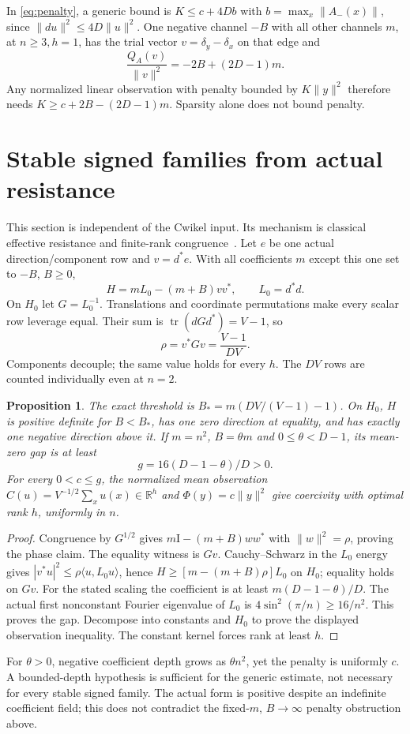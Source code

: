 \documentclass[11pt,a4paper]{article}
\newtheorem{proposition}[theorem]{Proposition}
\newcommand{\R}{\mathbb R}
\newcommand{\tr}{\operatorname{tr}}
\newcommand{\id}{\mathrm I}
\begin{document}
In \eqref{eq:penalty}, a generic bound is $K\leq c+4Db$ with
$b=\max_x\|A_-(x)\|$, since $\|du\|^2\leq4D\|u\|^2$.
One negative channel $-B$ with all other channels $m$, at $n\geq3,h=1$,
has the trial vector $v=\delta_y-\delta_x$ on that edge and
\[
 \frac{Q_A(v)}{\|v\|^2}=-2B+(2D-1)m.
\]
Any normalized linear observation with penalty bounded by $K\|y\|^2$
therefore needs $K\geq c+2B-(2D-1)m$. Sparsity alone does not bound penalty.

\section{Stable signed families from actual resistance}
This section is independent of the Cwikel input. Its mechanism is classical
effective resistance and finite-rank congruence~\cite{Zelazo,Spielman}.
Let $e$ be one actual direction/component row and $v=d^*e$. With all
coefficients $m$ except this one set to $-B$, $B\geq0$,
\[
 H=mL_0-(m+B)vv^*,\qquad L_0=d^*d.
\]
On $H_0$ let $G=L_0^{-1}$. Translations and coordinate permutations make
every scalar row leverage equal. Their sum is
$\tr(dGd^*)=V-1$, so
\begin{equation}\label{eq:rho}
 \rho=v^*Gv=\frac{V-1}{DV}.
\end{equation}
Components decouple; the same value holds for every $h$. The $DV$ rows
are counted individually even at $n=2$.

\begin{proposition}\label{prop:phase}
The exact threshold is $B_*=m(DV/(V-1)-1)$. On $H_0$, $H$ is positive
definite for $B<B_*$, has one zero direction at equality, and has exactly
one negative direction above it. If $m=n^2$, $B=\theta m$ and
$0\leq\theta<D-1$, its mean-zero gap is at least
\[
 g=16(D-1-\theta)/D>0.
\]
For every $0<c\leq g$, the normalized mean observation
$C(u)=V^{-1/2}\sum_xu(x)\in\R^h$ and $\Phi(y)=c\|y\|^2$ give coercivity
with optimal rank $h$, uniformly in $n$.
\end{proposition}
\begin{proof}
Congruence by $G^{1/2}$ gives $m\id-(m+B)ww^*$ with $\|w\|^2=\rho$,
proving the phase claim. The equality witness is $Gv$.
Cauchy--Schwarz in the $L_0$ energy gives
$|v^*u|^2\leq\rho\langle u,L_0u\rangle$, hence
$H\geq[m-(m+B)\rho]L_0$ on $H_0$; equality holds on $Gv$.
For the stated scaling the coefficient is at least
$m(D-1-\theta)/D$. The actual first nonconstant Fourier eigenvalue of $L_0$
is $4\sin^2(\pi/n)\geq16/n^2$. This proves the gap. Decompose into
constants and $H_0$ to prove the displayed observation inequality.
The constant kernel forces rank at least $h$.
\end{proof}
For $\theta>0$, negative coefficient depth grows as $\theta n^2$, yet the
penalty is uniformly $c$. A bounded-depth hypothesis is sufficient for the
generic estimate, not necessary for every stable signed family. The actual
form is positive despite an indefinite coefficient field; this does not
contradict the fixed-$m$, $B\to\infty$ penalty obstruction above.
\end{document}
